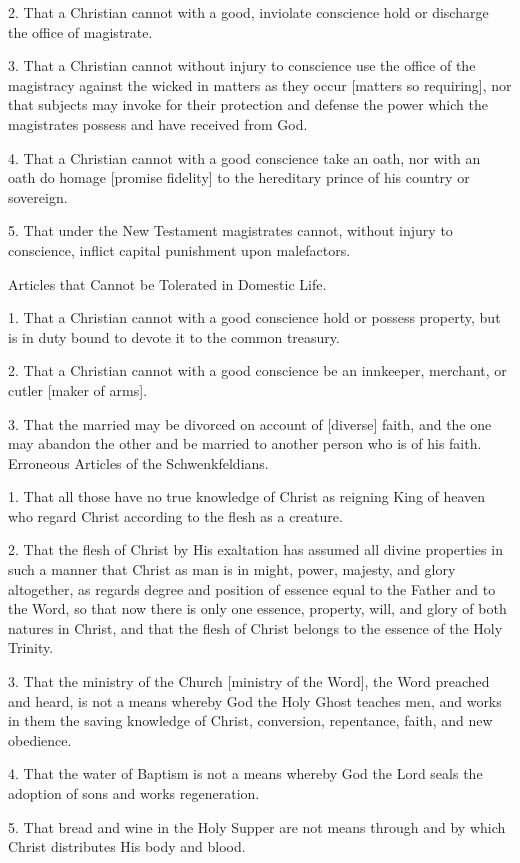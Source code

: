 2. That a Christian cannot with a good, inviolate conscience hold or discharge the office of magistrate.

3. That a Christian cannot without injury to conscience use the office of the magistracy against the wicked in matters as they occur [matters so requiring], nor that subjects may invoke for their protection and defense the power which the magistrates possess and have received from God.

4. That a Christian cannot with a good conscience take an oath, nor with an oath do homage [promise fidelity] to the hereditary prince of his country or sovereign.

5. That under the New Testament magistrates cannot, without injury to conscience, inflict capital punishment upon malefactors.

Articles that Cannot be Tolerated in Domestic Life.

1. That a Christian cannot with a good conscience hold or possess property, but is in duty bound to devote it to the common treasury.

2. That a Christian cannot with a good conscience be an innkeeper, merchant, or cutler [maker of arms].

3. That the married may be divorced on account of [diverse] faith, and the one may abandon the other and be married to another person who is of his faith.
Erroneous Articles of the Schwenkfeldians.

1. That all those have no true knowledge of Christ as reigning King of heaven who regard Christ according to the flesh as a creature.

2. That the flesh of Christ by His exaltation has assumed all divine properties in such a manner that Christ as man is in might, power, majesty, and glory altogether, as regards degree and position of essence equal to the Father and to the Word, so that now there is only one essence, property, will, and glory of both natures in Christ, and that the flesh of Christ belongs to the essence of the Holy Trinity.

3. That the ministry of the Church [ministry of the Word], the Word preached and heard, is not a means whereby God the Holy Ghost teaches men, and works in them the saving knowledge of Christ, conversion, repentance, faith, and new obedience.

4. That the water of Baptism is not a means whereby God the Lord seals the adoption of sons and works regeneration.

5. That bread and wine in the Holy Supper are not means through and by which Christ distributes His body and blood.

